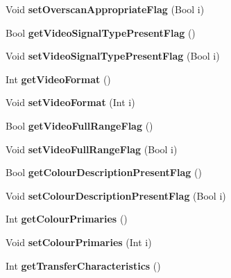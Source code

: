 \begin{DoxyCompactItemize}
Void {\bfseries set\+Overscan\+Appropriate\+Flag} (Bool i)
\item 
\mbox{\label{class_t_enc_cfg_a4265464393b7ddd9960481db1e0b3294}} 
Bool {\bfseries get\+Video\+Signal\+Type\+Present\+Flag} ()
\item 
\mbox{\label{class_t_enc_cfg_a5bd397b06ccd8dbbee13a9e741d79508}} 
Void {\bfseries set\+Video\+Signal\+Type\+Present\+Flag} (Bool i)
\item 
\mbox{\label{class_t_enc_cfg_a2e8793329b297acd5aeeca00a4f90f06}} 
Int {\bfseries get\+Video\+Format} ()
\item 
\mbox{\label{class_t_enc_cfg_aa18d264f4f359a7b0eab30174eff8599}} 
Void {\bfseries set\+Video\+Format} (Int i)
\item 
\mbox{\label{class_t_enc_cfg_ae32d3ba54118f4913df363117a859b62}} 
Bool {\bfseries get\+Video\+Full\+Range\+Flag} ()
\item 
\mbox{\label{class_t_enc_cfg_a045900f4bad268bac7e10e5dca8a5520}} 
Void {\bfseries set\+Video\+Full\+Range\+Flag} (Bool i)
\item 
\mbox{\label{class_t_enc_cfg_ab8095e745bd91f062c2aef2232ef39a1}} 
Bool {\bfseries get\+Colour\+Description\+Present\+Flag} ()
\item 
\mbox{\label{class_t_enc_cfg_ada6516205d15276506d43000ec3c3377}} 
Void {\bfseries set\+Colour\+Description\+Present\+Flag} (Bool i)
\item 
\mbox{\label{class_t_enc_cfg_a17fd26b1e9aceda640b1190e3856f24a}} 
Int {\bfseries get\+Colour\+Primaries} ()
\item 
\mbox{\label{class_t_enc_cfg_ac3f192d7a82a89119db8c825645e1cae}} 
Void {\bfseries set\+Colour\+Primaries} (Int i)
\item 
\mbox{\label{class_t_enc_cfg_adce01110ed29c663b05db0b3b1b0e8f7}} 
Int {\bfseries get\+Transfer\+Characteristics} ()
\item 

\end{DoxyCompactItemize}
